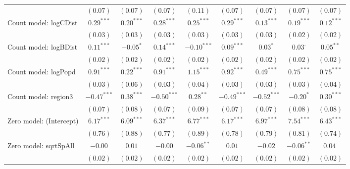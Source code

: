 \begin{sidewaystable}
\begin{center}
{\begin{tabular}{l c c c c c c c c}
                               & $(0.07)$      & $(0.07)$      & $(0.07)$      & $(0.11)$      & $(0.07)$       & $(0.07)$      & $(0.07)$       & $(0.07)$       \\
Count model: logCDist          & $0.29^{***}$  & $0.20^{***}$  & $0.28^{***}$  & $0.25^{***}$  & $0.29^{***}$   & $0.13^{***}$  & $0.19^{***}$   & $0.12^{***}$   \\
                               & $(0.03)$      & $(0.03)$      & $(0.03)$      & $(0.03)$      & $(0.03)$       & $(0.03)$      & $(0.02)$       & $(0.02)$       \\
Count model: logBDist          & $0.11^{***}$  & $-0.05^{*}$   & $0.14^{***}$  & $-0.10^{***}$ & $0.09^{***}$   & $0.03^{*}$    & $0.03^{\cdot}$ & $0.05^{**}$    \\
                               & $(0.02)$      & $(0.02)$      & $(0.02)$      & $(0.02)$      & $(0.02)$       & $(0.02)$      & $(0.02)$       & $(0.02)$       \\
Count model: logPopd           & $0.91^{***}$  & $0.22^{***}$  & $0.91^{***}$  & $1.15^{***}$  & $0.92^{***}$   & $0.49^{***}$  & $0.75^{***}$   & $0.75^{***}$   \\
                               & $(0.03)$      & $(0.06)$      & $(0.03)$      & $(0.04)$      & $(0.03)$       & $(0.03)$      & $(0.03)$       & $(0.04)$       \\
Count model: region3           & $-0.47^{***}$ & $0.38^{***}$  & $-0.50^{***}$ & $0.28^{**}$   & $-0.49^{***}$  & $-0.52^{***}$ & $-0.20^{*}$    & $0.30^{***}$   \\
                               & $(0.07)$      & $(0.08)$      & $(0.07)$      & $(0.09)$      & $(0.07)$       & $(0.07)$      & $(0.08)$       & $(0.08)$       \\
Zero model: (Intercept)        & $6.17^{***}$  & $6.09^{***}$  & $6.37^{***}$  & $6.77^{***}$  & $6.17^{***}$   & $6.97^{***}$  & $7.54^{***}$   & $6.43^{***}$   \\
                               & $(0.76)$      & $(0.88)$      & $(0.77)$      & $(0.89)$      & $(0.78)$       & $(0.79)$      & $(0.81)$       & $(0.74)$       \\
Zero model: sqrtSpAll          & $-0.00$       & $0.01$        & $-0.00$       & $-0.06^{**}$  & $0.01$         & $-0.02$       & $-0.06^{**}$   & $0.04^{\cdot}$ \\
                               & $(0.02)$      & $(0.02)$      & $(0.02)$      & $(0.02)$      & $(0.02)$       & $(0.02)$      & $(0.02)$       & $(0.02)$       \\

\end{tabular}}
\end{center}
\end{sidewaystable}
